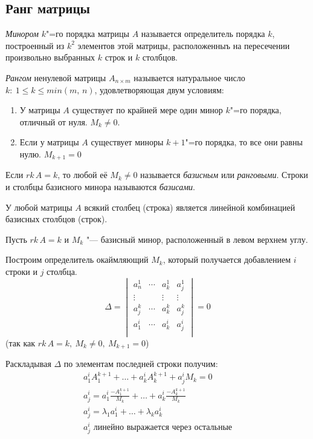 \subsection*{Ранг матрицы}

\begin{definition}
  \textit{Минором} $k$"=го порядка матрицы $A$ называется определитель порядка $k$, построенный из $k^2$ элементов этой матрицы, расположенныъ на пересечении произвольно выбранных $k$ строк и $k$ столбцов.
\end{definition}
\begin{definition}
  \textit{Рангом} ненулевой  матрицы $A_{n\times m}$ называется натуральное число $k:~ 1 \leq k \leq min(m,\, n)$, удовлетворяющая двум условиям:
  \begin{enumerate}
    \item У матрицы $A$ существует по крайней мере один минор $k$"=го порядка, отличный от нуля. $M_k \neq 0$.
    \item Если у матрицы $A$ существует миноры $k+1$"=го порядка, то все они равны нулю. $M_{k+1} = 0$
  \end{enumerate}
\end{definition}

\begin{definition}
  Если $rk\,A = k$, то любой её $M_k \neq 0$ называется \textit{базисным} или \textit{ранговыми}. Строки и столбцы базисного минора называются \textit{базисами}.
\end{definition}
\begin{theorem}
  У любой матрицы $A$ всякий столбец (строка) является линейной комбинацией базисных столбцов (строк).
\end{theorem}
\begin{Proof}
  Пусть $rk\,A = k$ и $M_k$ "--- базисный минор, расположенный в левом верхнем углу.

  Построим определитель окаймляющий $M_k$, который получается добавлением $i$ строки и $j$ столбца.
  \begin{equation*}
    \Delta = \begin{vmatrix}
      a_n^1 & \cdots & a_k^1 &  a_j^1 \\
      \vdots && \vdots & \vdots \\
      a_j^k & \cdots & a_k^k  & a_j^k \\
      a_1^i & \cdots & a_k^i & a_j^i \\
    \end{vmatrix} = 0
  \end{equation*}
  (так как $rk\,A = k,~ M_k \neq 0, ~M_{k + 1} = 0$)

  Раскладывая $\Delta$ по элементам последней строки получим:
  \begin{gather*}
    a_1^i A_1^{k+1} + \ldots + a_k^i A_k^{k + 1} + a_j^i M_k = 0 \\
    a_j^i = a_1^i \frac{-A_1^{k + 1}}{M_k} + \ldots + a_k^i \frac{-A_k^{k + 1}}{M_k} \\
    a_j^i = \lambda_1 a_1^i + \ldots + \lambda_k a_k^i \\
    a_j^i \text{ линейно выражается через остальные}
  \end{gather*}
\end{Proof}

